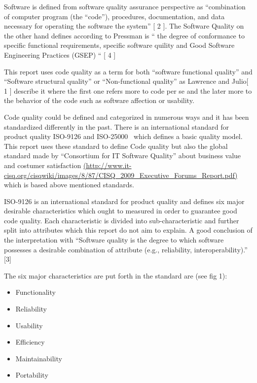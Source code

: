 

Software is defined from software quality assurance perspective as “combination of computer program (the “code”), procedures, documentation, and data necessary for operating the software the system” [ 2 ]. The Software Quality on the other hand defines according to Pressman is “ the degree of conformance to specific functional requirements, specific software quility and Good Software Engineering Practices (GSEP) “ [ 4 ]

This report uses code quality as a term for both “software functional quality” and “Software structural quality” or “Non-functional quality” as Lawrence and Julio[ 1 ] describe it where the first one refers more to code per se and the later more to the behavior of the code such as software affection or usability. 

Code quality could be defined and categorized in numerous ways and it has been standardized differently in the past. There is an international standard for product quality ISO-9126 and ISO-25000~\cite{ISO9126}  which defines a basic quality model. This report uses these standard to define Code quality but also the global standard made by “Consortium for IT Software Quality” about business value and costumer satisfaction \url{(http://www.it-cisq.org/cisqwiki/images/8/87/CISQ_2009_Executive_Forums_Report.pdf)} which is based above mentioned standards. 

ISO-9126 is an international standard for product quality and defines six major desirable characteristics which ought to measured in order to guarantee good code quality. Each characteristic is divided into sub-characteristic and further split into attributes which this report do not aim to explain. A good conclusion of the interpretation with 
“Software quality is the degree to which software possesses a desirable combination of attribute (e.g., reliability, interoperability).” [3]

The six major characteristics are put forth in the standard are (see fig 1): 
\begin{itemize}
\item Functionality 
\item Reliability
\item Usability
\item Efficiency
\item Maintainability
\item Portability
\end{itemize}

